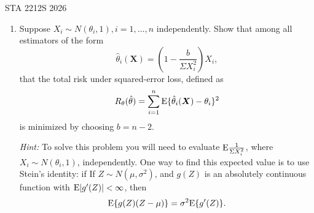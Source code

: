 \documentclass[12pt]{article}
\def\E{{\rm E}}
\begin{document}
 {\hfill STA 2212S 2026}\\


\bigskip

\begin{enumerate}

\item Suppose $X_i \sim N(\theta_i, 1), i = 1, \dots, n$ independently. Show that among all estimators of the form $$ \hat\theta_i(\boldsymbol{X}) = \left( 1-\frac{b}{\Sigma X_i^2}\right)X_i,$$ that the total risk under squared-error loss, defined as $$ R_\theta(\hat\theta) = \sum_{i=1}^n \E\{\hat\theta_i(\boldsymbol{X}) - \theta_i\}^2$$ is minimized by choosing $b = n-2$.

{\it Hint:} To solve this problem you will need to evaluate $\E\frac{1}{\Sigma X_i^2}$, where $X_i \sim N(\theta_i, 1)$, independently. One way to find this expected value is to use Stein's identity: if If $Z \sim N(\mu, \sigma^2)$, and $g(Z)$ is an absolutely continuous function with $\E|g'(Z)|< \infty$, then  
\begin{equation}
\E\{g(Z)(Z-\mu)\} = \sigma^2\E\{g'(Z)\}.	 \nonumber
\end{equation}


\end{enumerate}
\end{document}
